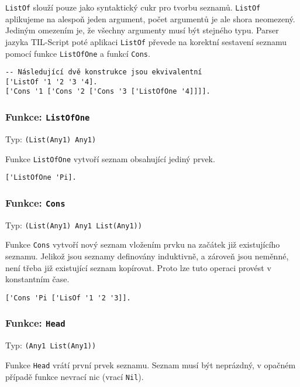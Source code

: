 \lstinline{ListOf} slouží pouze jako syntaktický cukr pro tvorbu seznamů. \lstinline{ListOf}
aplikujeme na alespoň jeden argument, počet argumentů je ale shora neomezený. Jediným omezením je,
že všechny argumenty musí být stejného typu. Parser jazyka TIL-Script poté aplikaci
\lstinline{ListOf} převede na korektní sestavení seznamu pomocí funkce \lstinline{ListOfOne} a
funkcí \lstinline{Cons}.


\begin{lstlisting}[caption={Ukázka využití ListOf}]
-- Následující dvě konstrukce jsou ekvivalentní
['ListOf '1 '2 '3 '4].
['Cons '1 ['Cons '2 ['Cons '3 ['ListOfOne '4]]]].
\end{lstlisting}

\subsubsection*{Funkce: \lstinline|ListOfOne|}
Typ: \lstinline{(List(Any1) Any1)}

Funkce \lstinline{ListOfOne} vytvoří seznam obsahující jediný prvek.

\begin{lstlisting}[caption={Ukázka využití ListOfOne}]
['ListOfOne 'Pi].
\end{lstlisting}

\subsubsection*{Funkce: \lstinline|Cons|}
Typ: \lstinline{(List(Any1) Any1 List(Any1))}

Funkce \lstinline{Cons} vytvoří nový seznam vložením prvku na začátek již existujícího seznamu.
Jelikož jsou seznamy definovány induktivně, a zároveň jsou neměnné, není třeba již existující seznam
kopírovat. Proto lze tuto operaci provést v konstantním čase.

\begin{lstlisting}[caption={Ukázka využití Cons}]
['Cons 'Pi ['LisOf '1 '2 '3]].
\end{lstlisting}

\subsubsection*{Funkce: \lstinline|Head|}
Typ: \lstinline{(Any1 List(Any1))}

Funkce \lstinline{Head} vrátí první prvek seznamu. Seznam musí být neprázdný, v opačném případě
funkce nevrací nic (vrací \lstinline{Nil}).

